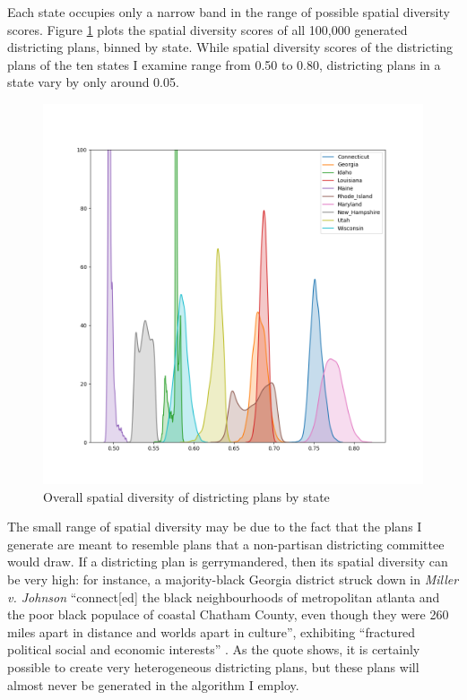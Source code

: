 \documentclass[]{article}
\begin{document}
Each state occupies only a narrow band in the range of possible spatial
diversity scores. Figure \ref{sd_plans} plots the spatial diversity
scores of all 100,000 generated districting plans, binned by state.
While spatial diversity scores of the districting plans of the ten
states I examine range from 0.50 to 0.80, districting plans in a state
vary by only around 0.05.

\begin{figure}
\centering
\includegraphics{../30_results/all_plans_sd.png}
\caption{Overall spatial diversity of districting plans by state
\label{sd_plans}}
\end{figure}

The small range of spatial diversity may be due to the fact that the
plans I generate are meant to resemble plans that a non-partisan
districting committee would draw. If a districting plan is
gerrymandered, then its spatial diversity can be very high: for
instance, a majority-black Georgia district struck down in \emph{Miller
v. Johnson} ``connect{[}ed{]} the black neighbourhoods of metropolitan
atlanta and the poor black populace of coastal Chatham County, even
though they were 260 miles apart in distance and worlds apart in
culture'', exhibiting ``fractured political social and economic
interests'' \citep{steph2012}. As the quote shows, it is certainly
possible to create very heterogeneous districting plans, but these plans
will almost never be generated in the algorithm I employ.
\end{document}
